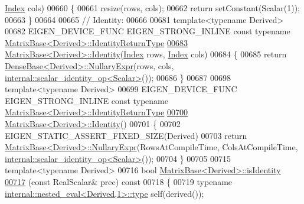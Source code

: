 \begin{DoxyCode}
      \hyperlink{namespace_eigen_a62e77e0933482dafde8fe197d9a2cfde}{Index} cols)
00660 \{
00661   resize(rows, cols);
00662   \textcolor{keywordflow}{return} setConstant(Scalar(1));
00663 \}
00664 
00665 \textcolor{comment}{// Identity:}
00666 
00681 \textcolor{keyword}{template}<\textcolor{keyword}{typename} Derived>
00682 EIGEN\_DEVICE\_FUNC EIGEN\_STRONG\_INLINE \textcolor{keyword}{const} \textcolor{keyword}{typename} 
      \hyperlink{group___core___module_class_eigen_1_1_cwise_nullary_op}{MatrixBase<Derived>::IdentityReturnType}
\hyperlink{group___core___module_ae717f291d83ab229ae64a4903d9f987d}{00683} \hyperlink{group___core___module_a2ef43190f3aba0aef0cf1030d46d0ca7}{MatrixBase<Derived>::Identity}(\hyperlink{namespace_eigen_a62e77e0933482dafde8fe197d9a2cfde}{Index} rows, 
      \hyperlink{namespace_eigen_a62e77e0933482dafde8fe197d9a2cfde}{Index} cols)
00684 \{
00685   \textcolor{keywordflow}{return} \hyperlink{group___core___module_class_eigen_1_1_dense_base}{DenseBase<Derived>::NullaryExpr}(rows, cols, 
      \hyperlink{struct_eigen_1_1internal_1_1scalar__identity__op}{internal::scalar\_identity\_op<Scalar>}());
00686 \}
00687 
00698 \textcolor{keyword}{template}<\textcolor{keyword}{typename} Derived>
00699 EIGEN\_DEVICE\_FUNC EIGEN\_STRONG\_INLINE \textcolor{keyword}{const} \textcolor{keyword}{typename} 
      \hyperlink{group___core___module_class_eigen_1_1_cwise_nullary_op}{MatrixBase<Derived>::IdentityReturnType}
\hyperlink{group___core___module_a2ef43190f3aba0aef0cf1030d46d0ca7}{00700} \hyperlink{group___core___module_a2ef43190f3aba0aef0cf1030d46d0ca7}{MatrixBase<Derived>::Identity}()
00701 \{
00702   EIGEN\_STATIC\_ASSERT\_FIXED\_SIZE(Derived)
00703   \textcolor{keywordflow}{return} \hyperlink{group___core___module_class_eigen_1_1_matrix_base}{MatrixBase<Derived>::NullaryExpr}(RowsAtCompileTime, 
      ColsAtCompileTime, \hyperlink{struct_eigen_1_1internal_1_1scalar__identity__op}{internal::scalar\_identity\_op<Scalar>}());
00704 \}
00705 
00715 \textcolor{keyword}{template}<\textcolor{keyword}{typename} Derived>
00716 \textcolor{keywordtype}{bool} \hyperlink{group___core___module_a4ccbd8dfa06e9d47b9bf84711f8b9d40}{MatrixBase<Derived>::isIdentity}
\hyperlink{group___core___module_a4ccbd8dfa06e9d47b9bf84711f8b9d40}{00717} (\textcolor{keyword}{const} RealScalar& prec) \textcolor{keyword}{const}
00718 \{
00719   \textcolor{keyword}{typename} \hyperlink{class_eigen_1_1internal_1_1_tensor_lazy_evaluator_writable}{internal::nested\_eval<Derived,1>::type} \textcolor{keyword}{self}(derived());

\end{DoxyCode}
